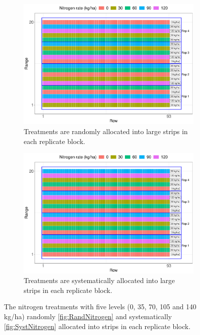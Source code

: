 \documentclass[a4paper]{article} 	%
\begin{document}
\begin{figure}[!htp]
	\begin{subfigure}[t]{0.45\textwidth}
		\centering
		\includegraphics[width=\linewidth]{Expt/Col_RandNitro.pdf}
		\caption{Treatments are randomly allocated into large strips in each replicate block.}\label{fig:RandNitrogen}
	\end{subfigure}
	\hspace{0.05\textwidth}
	\begin{subfigure}[t]{0.45\textwidth}
		\centering
		\includegraphics[width=\linewidth]{Expt/Col_SystNitro.pdf}
		\caption{Treatments are systematically allocated into large strips in each replicate block.}\label{fig:SystNitrogen}
	\end{subfigure}
	\caption{The nitrogen treatments with five levels (0, 35, 70, 105 and 140 kg/ha) randomly \eqref{fig:RandNitrogen} and systematically \eqref{fig:SystNitrogen} allocated into strips in each replicate block.}\label{fig:Nitrogen}
\end{figure}
\end{document}
